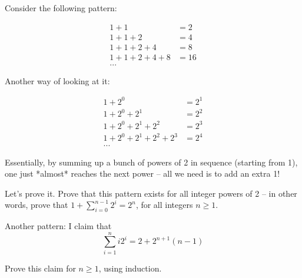 \begin{problem}
\label{power-2-sum}

Consider the following pattern:

\begin{align*}
1 + 1 &= 2 \\
1 + 1 + 2 &= 4 \\
1 + 1 + 2 + 4 &= 8 \\
1 + 1 + 2 + 4 + 8 &= 16 \\
...
\end{align*}


Another way of looking at it:

\begin{align*}
1 + 2^0 &= 2^1 \\
1 + 2^0 + 2^1 &= 2^2 \\
1 + 2^0 + 2^1 + 2^2 &= 2^3 \\
1 + 2^0 + 2^1 + 2^2 + 2^3 &= 2^4 \\
...
\end{align*}


Essentially, by summing up a bunch of powers of 2 in sequence (starting from 1), one just *almost* reaches the next power -- all we need is to add an extra 1!


Let's prove it. Prove that this pattern exists for all integer powers of 2 -- in other words, prove that $1 + \sum_{i=0}^{n-1} 2^i = 2^n$, for all integers $n \geq 1$.

\end{problem}

\begin{problem}
\label{pr:sum-i2i}
Another pattern: I claim that
\begin{equation*}
\sum_{i=1}^{n} i2^i = 2+2^{n+1}(n-1)
\end{equation*}

Prove this claim for $n \geq 1$, using induction.

\end{problem}


